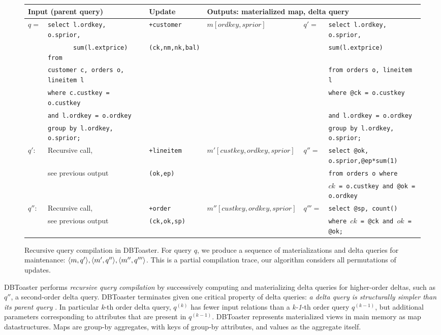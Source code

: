 \def \sql#1{{\scriptsize {\tt #1}}}
\begin{figure*}[htbp]

\vspace{-8mm}

\begin{tabular}{ll|l|l|ll}
\multicolumn{2}{l}{Input (parent query)}
& Update 
& \multicolumn{3}{l}{Outputs: materialized map, delta query}
\\
\hline
$q =$
& \sql{select l.ordkey, o.sprior,}
& \texttt{+customer}
& $m[ordkey,sprior]$
& $q' =$
& \sql{select l.ordkey, o.sprior,}
\\
& \sql{\ \ \ \ \ \ \ sum(l.extprice) from}
& \texttt{(ck,nm,nk,bal)}
& & & \sql{sum(l.extprice)}
\\
& \sql{customer c, orders o, lineitem l}
& & & & \sql{from orders o, lineitem l}
\\
& \sql{where c.custkey = o.custkey}
& & & & \sql{where @ck = o.custkey} 
\\
& \sql{and l.ordkey = o.ordkey}
& & & & \sql{and l.ordkey = o.ordkey}
\\
& \sql{group by l.ordkey, o.sprior;}
& & & & \sql{group by l.ordkey, o.sprior;}
\\
\hline
$q'$:
& Recursive call,
& \texttt{+lineitem} 
& $m'[custkey,ordkey,sprior]$
& $q'' =$ & \sql{select @ok, o.sprior,@ep*sum(1)}
\\
& see previous output
& \texttt{(ok,ep)} & & & \sql{from orders o where}
\\
& & & & & \sql{$ck$ = o.custkey and @ok = o.ordkey}
\\
\hline
$q''$:
& Recursive call,
& \texttt{+order} 
& $m''[custkey,ordkey,sprior]$
& $q'''=$ & \sql{select @sp, count()}
\\
& see previous output
& \texttt{(ck,ok,sp)}
& & & \sql{where $ck$ = @ck and $ok$ = @ok;}
\end{tabular}
\caption{Recursive query compilation in DBToaster. For query $q$, we produce a
sequence of materializations and delta queries for maintenance: ${\langle m,q'\rangle},
{\langle m',q''\rangle}, {\langle m'',q'''\rangle}$. This is a partial compilation trace, our
algorithm considers all permutations of updates.}
\label{fig:compex}
\end{figure*}

DBToaster performs \textit{recursive query compilation} by successively
computing and materializing delta queries for higher-order deltas, such as
$q''$, a second-order delta query. DBToaster terminates given one critical
property of delta queries: \textit{a delta query is structurally simpler than its
parent query} \cite{koch-pods:10}. In particular \textit{k}-th order delta query, $q^{(k)}$ has fewer
input relations than a \textit{k-1}-th order query $q^{(k-1)}$, but additional
parameters corresponding to attributes that are present in $q^{(k-1)}$.
DBToaster represents materialized views in main memory as map datastructures.
Maps are group-by aggregates, with keys of group-by attributes, and values as
the aggregate itself.

